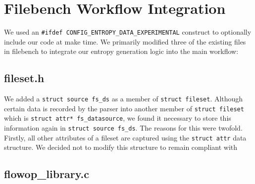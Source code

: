 \section{Filebench Workflow Integration}
We used an \verb+#ifdef CONFIG_ENTROPY_DATA_EXPERIMENTAL+ construct to optionally include our code at make time. We primarily modified three of the existing files in filebench to integrate our entropy generation logic into the main workflow:
\subsection{fileset.h}
We added a \verb+struct source fs_ds+ as a member of \verb+struct fileset+. Although certain data is recorded by the parser into another member of \verb+struct fileset+ which is \verb+struct attr* fs_datasource+, we found it necessary to store this information again in \verb+struct source fs_ds+. The reasons for this were twofold. Firstly, all other attributes of a fileset are captured using the \verb+struct attr+ data structure. We decided not to modify this structure to remain compliant with 
\subsection{flowop\_library.c}
